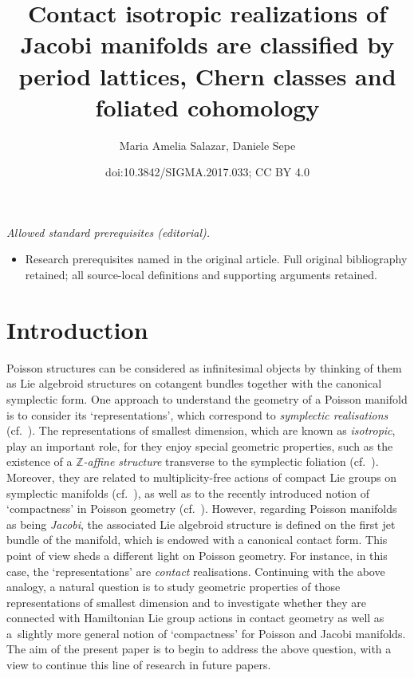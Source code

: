 \documentclass[10pt,a4paper]{amsart}
\title{Contact isotropic realizations of Jacobi manifolds are classified by period lattices, Chern classes and foliated cohomology}
\author{Maria Amelia Salazar, Daniele Sepe}
\date{doi:10.3842/SIGMA.2017.033; CC BY 4.0}
\numberwithin{equation}{section}
\newcommand{\ZZ}{\mathbb{Z}}
\begin{document}
\maketitle
\noindent\textit{Allowed standard prerequisites (editorial).}\begin{itemize}
\item Research prerequisites named in the original article. Full original bibliography retained; all source-local definitions and supporting arguments retained.
\end{itemize}\medskip
\section{Introduction}\label{sec:introduction}
Poisson structures can be considered as inf\/initesimal objects by thinking of them as Lie algebroid structures on cotangent bundles together with the canonical symplectic form. One approach to understand the geometry of a Poisson manifold is to consider its `representations', which correspond to {\it symplectic realisations} (cf.~\cite{CrainicFernandes:jdd,Weinstein}). The representations of smallest dimension, which are known as {\it isotropic}, play an important role, for they enjoy special geometric properties, such as the existence of a {\it $\ZZ$-affine structure} transverse to the symplectic foliation (cf.~\cite{PMCT2, dd}). Moreover, they are related to multiplicity-free actions of compact Lie groups on symplectic manifolds (cf.~\cite{dd,gui_sja}), as well as to the recently introduced notion of `compactness' in Poisson geometry (cf.\ \cite{PMCT1,PMCT2}). However, regarding Poisson manifolds as being {\it Jacobi}, the associated Lie algebroid structure is def\/ined on the f\/irst jet bundle of the manifold, which is endowed with a canonical contact form. This point of view sheds a dif\/ferent light on Poisson geometry. For instance, in this case, the `representations' are {\it contact} realisations. Continuing with the above analogy, a natural question is to study geometric properties of those representations of smallest dimension and to investigate whether they are connected with Hamiltonian Lie group actions in contact geometry as well as a~slightly more general notion of `compactness' for Poisson and Jacobi manifolds. The aim of the present paper is to begin to address the above question, with a view to continue this line of research in future papers.
\end{document}
